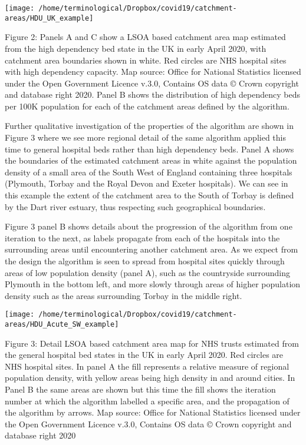 \documentclass[
]{article}
\begin{document}
\begin{center}\texttt{[image: /home/terminological/Dropbox/covid19/catchment-areas/HDU\_UK\_example]} \end{center}

Figure 2: Panels A and C show a LSOA based catchment area map estimated
from the high dependency bed state in the UK in early April 2020, with
catchment area boundaries shown in white. Red circles are NHS hospital
sites with high dependency capacity. Map source: Office for National
Statistics licensed under the Open Government Licence v.3.0, Contains OS
data © Crown copyright and database right 2020. Panel B shows the
distribution of high dependency beds per 100K population for each of the
catchment areas defined by the algorithm.

Further qualitative investigation of the properties of the algorithm are
shown in Figure 3 where we see more regional detail of the same
algorithm applied this time to general hospital beds rather than high
dependency beds. Panel A shows the boundaries of the estimated catchment
areas in white against the population density of a small area of the
South West of England containing three hospitals (Plymouth, Torbay and
the Royal Devon and Exeter hospitals). We can see in this example the
extent of the catchment area to the South of Torbay is defined by the
Dart river estuary, thus respecting such geographical boundaries.

Figure 3 panel B shows details about the progression of the algorithm
from one iteration to the next, as labels propagate from each of the
hospitals into the surrounding areas until encountering another
catchment area. As we expect from the design the algorithm is seen to
spread from hospital sites quickly through areas of low population
density (panel A), such as the countryside surrounding Plymouth in the
bottom left, and more slowly through areas of higher population density
such as the areas surrounding Torbay in the middle right.

\begin{center}\texttt{[image: /home/terminological/Dropbox/covid19/catchment-areas/HDU\_Acute\_SW\_example]} \end{center}

Figure 3: Detail LSOA based catchment area map for NHS trusts estimated
from the general hospital bed states in the UK in early April 2020. Red
circles are NHS hospital sites. In panel A the fill represents a
relative measure of regional population density, with yellow areas being
high density in and around cities. In Panel B the same areas are shown
but this time the fill shows the iteration number at which the algorithm
labelled a specific area, and the propagation of the algorithm by
arrows. Map source: Office for National Statistics licensed under the
Open Government Licence v.3.0, Contains OS data © Crown copyright and
database right 2020
\end{document}
